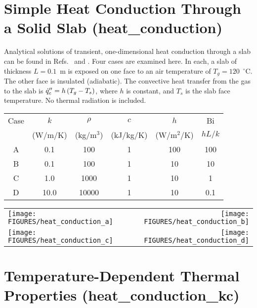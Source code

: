 \documentclass[11pt]{book}
\begin{document}
\clearpage

\section{Simple Heat Conduction Through a Solid Slab (\texorpdfstring{{\bf heat\_conduction}}{heat\_conduction})}
\label{heat_conduction}

Analytical solutions of transient, one-dimensional heat conduction through a slab can be found in Refs.~\cite{Drysdale:1} and \cite{Carslaw:1}. Four
cases are examined here. In each, a slab of thickness $L=0.1$~m is exposed on one face to an air temperature of $T_g=120$~$^\circ$C. The other face
is insulated (adiabatic). The convective heat transfer from the gas to the slab is $\dot{q}_c'' = h \, (T_g - T_s)$, where $h$ is constant, and $T_s$ is
the slab face temperature. No thermal radiation is included.
\begin{center}
\begin{tabular}{|c|c|c|c|c|c|}
\hline
Case  &  $k$      & $\rho$       &  $c$          &   $h$         &  Bi     \\
      & (W/m/K)   & (kg/m$^3$)   &  (kJ/kg/K)    &  (W/m$^2$/K)  &  $hL/k$ \\ \hline \hline
A     &   0.1     & 100          &  1            &  100          &  100    \\ \hline
B     &   0.1     & 100          &  1            &  10           &  10     \\ \hline
C     &   1.0     & 1000         &  1            &  10           &  1      \\ \hline
D     &  10.0     & 10000        &  1            &  10           & 0.1     \\ \hline
\end{tabular}
\end{center}

\noindent
\begin{tabular*}{\textwidth}{l@{\extracolsep{\fill}}r}
\texttt{[image: FIGURES/heat\_conduction\_a]} &
\texttt{[image: FIGURES/heat\_conduction\_b]} \\
\texttt{[image: FIGURES/heat\_conduction\_c]} &
\texttt{[image: FIGURES/heat\_conduction\_d]}
\end{tabular*}


\clearpage

\section{Temperature-Dependent Thermal Properties (\texorpdfstring{{\bf heat\_conduction\_kc}}{heat\_conduction\_kc})}
\label{heat_conduction_kc}
\end{document}
